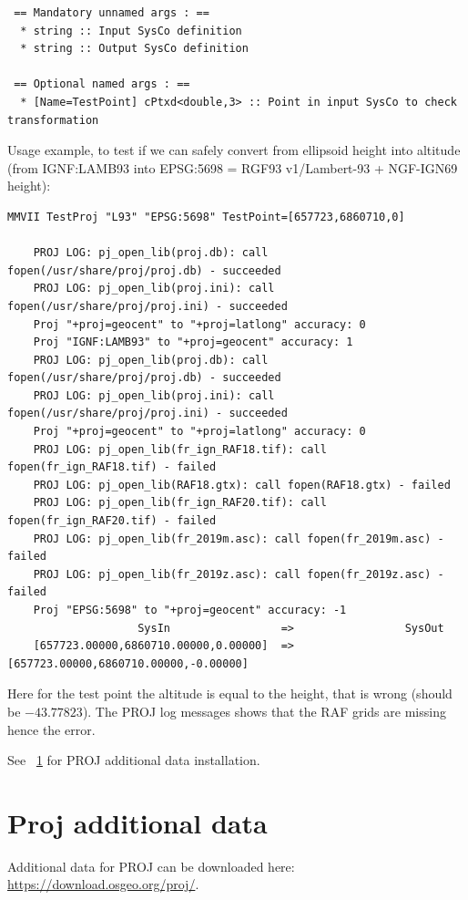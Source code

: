 \begin{verbatim}
 == Mandatory unnamed args : ==
  * string :: Input SysCo definition
  * string :: Output SysCo definition

 == Optional named args : ==
  * [Name=TestPoint] cPtxd<double,3> :: Point in input SysCo to check transformation
\end{verbatim}

Usage example, to test if we can safely convert from ellipsoid height into altitude
(from IGNF:LAMB93 into EPSG:5698 = RGF93 v1/Lambert-93 + NGF-IGN69 height):

\begin{verbatim}
MMVII TestProj "L93" "EPSG:5698" TestPoint=[657723,6860710,0]

    PROJ LOG: pj_open_lib(proj.db): call fopen(/usr/share/proj/proj.db) - succeeded
    PROJ LOG: pj_open_lib(proj.ini): call fopen(/usr/share/proj/proj.ini) - succeeded
    Proj "+proj=geocent" to "+proj=latlong" accuracy: 0
    Proj "IGNF:LAMB93" to "+proj=geocent" accuracy: 1
    PROJ LOG: pj_open_lib(proj.db): call fopen(/usr/share/proj/proj.db) - succeeded
    PROJ LOG: pj_open_lib(proj.ini): call fopen(/usr/share/proj/proj.ini) - succeeded
    Proj "+proj=geocent" to "+proj=latlong" accuracy: 0
    PROJ LOG: pj_open_lib(fr_ign_RAF18.tif): call fopen(fr_ign_RAF18.tif) - failed
    PROJ LOG: pj_open_lib(RAF18.gtx): call fopen(RAF18.gtx) - failed
    PROJ LOG: pj_open_lib(fr_ign_RAF20.tif): call fopen(fr_ign_RAF20.tif) - failed
    PROJ LOG: pj_open_lib(fr_2019m.asc): call fopen(fr_2019m.asc) - failed
    PROJ LOG: pj_open_lib(fr_2019z.asc): call fopen(fr_2019z.asc) - failed
    Proj "EPSG:5698" to "+proj=geocent" accuracy: -1
                    SysIn                 =>                 SysOut                
    [657723.00000,6860710.00000,0.00000]  =>  [657723.00000,6860710.00000,-0.00000]
\end{verbatim}

Here for the test point the altitude is equal to the height, that is wrong (should be  $-43.77823$).
The PROJ log messages shows that the RAF grids are missing hence the error.

See ~\ref{ProjData} for PROJ additional data installation.


\section{Proj additional data}
\label{ProjData}
Additional data for PROJ can be downloaded here: \url{https://download.osgeo.org/proj/}.

